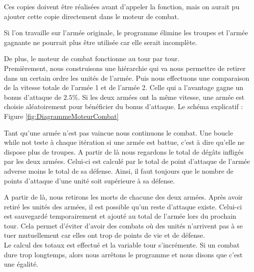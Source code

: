 \documentclass[a4paper]{article} %
\begin{document}
Ces copies doivent être réalisées avant d'appeler la fonction, mais on aurait pu ajouter cette copie directement dans le moteur de combat.

Si l'on travaille sur l'armée originale, le programme élimine les troupes et l'armée gagnante ne pourrait plus être utilisée car elle serait incomplète.

De plus, le moteur de combat fonctionne au tour par tour. \\

Premièrement, nous construisons une hiérarchie qui va nous permettre de retirer dans un certain ordre les unités de l'armée. Puis nous effectuons une comparaison de la vitesse totale de l'armée 1 et de l'armée 2. Celle qui a l'avantage gagne un bonus d'attaque de $2.5\%$. Si les deux armées ont la même vitesse, une armée est choisie aléatoirement pour bénéficier du bonus d'attaque. Le schéma explicatif : Figure \ref{fig:DiagrammeMoteurCombat}

Tant qu'une armée n'est pas vaincue nous continuons le combat. Une boucle while not teste à chaque itération si une armée est battue, c'est à dire qu'elle ne dispose plus de troupes. A partir de là nous regardons le total de dégâts infligés par les deux armées. Celui-ci est calculé par le total de point d'attaque de l'armée adverse moins le total de sa défense. Ainsi, il faut toujours que le nombre de points d'attaque d'une unité soit supérieure à sa défense.

A partir de là, nous retirons les morts de chacune des deux armées. Après avoir retiré les unités des armées, il est possible qu'un reste d'attaque existe. Celui-ci est sauvegardé temporairement et ajouté au total de l'armée lors du prochain tour. Cela permet d'éviter d'avoir des combats où des unités n'arrivent pas à se tuer mutuellement car elles ont trop de points de vie et de défense.\\

Le calcul des totaux est effectué et la variable tour s'incrémente.
Si un combat dure trop longtemps, alors nous arrêtons le programme et nous disons que c'est une égalité.\\
\end{document}

